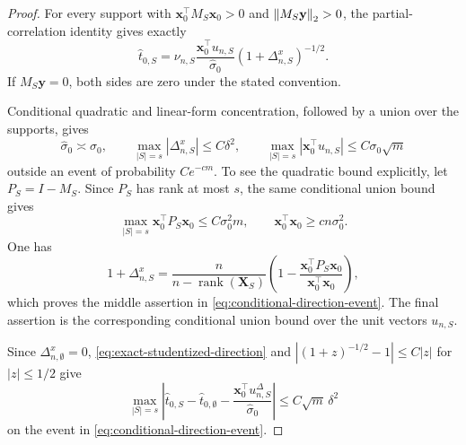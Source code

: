\begin{proof}
For every support with
$\mathbf x_0^\top M_S\mathbf x_0>0$ and
$\left\lVert M_S\mathbf y\right\rVert_2>0$, the partial-correlation identity gives exactly
\begin{equation}\label{eq:exact-studentized-direction}
        \hat t_{0,S}
        =\nu_{n,S}\frac{\mathbf x_0^\top u_{n,S}}{\hat\sigma_0}
        (1+\Delta^x_{n,S})^{-1/2}.
\end{equation}
If $M_S\mathbf y=0$, both sides are zero under the stated convention.

Conditional quadratic and linear-form concentration, followed by a union
over the supports, gives
\begin{equation}\label{eq:conditional-direction-event}
        \hat\sigma_0\asymp\sigma_0,
        \qquad
        \max_{|S|=s}|\Delta^x_{n,S}|\le C\delta^2,
        \qquad
        \max_{|S|=s}|\mathbf x_0^\top u_{n,S}|
        \le C\sigma_0\sqrt m
\end{equation}
outside an event of probability $Ce^{-cm}$.  To see the quadratic bound
explicitly, let $P_S=I-M_S$.  Since $P_S$ has rank at most $s$, the same
conditional union bound gives
\[
 \max_{|S|=s}\mathbf x_0^\top P_S\mathbf x_0
 \le C\sigma_0^2m,
 \qquad
 \mathbf x_0^\top\mathbf x_0\ge cn\sigma_0^2.
\]
One has
\[
 1+\Delta^x_{n,S}
 =\frac{n}{n-\operatorname{rank}(\mathbf X_S)}\left(1-
 \frac{\mathbf x_0^\top P_S\mathbf x_0}
 {\mathbf x_0^\top\mathbf x_0}\right),
\]
which proves the middle assertion in
\eqref{eq:conditional-direction-event}.  The final assertion is the
corresponding conditional union bound over the unit vectors $u_{n,S}$.

Since $\Delta^x_{n,\emptyset}=0$,
\eqref{eq:exact-studentized-direction} and
$|(1+z)^{-1/2}-1|\le C|z|$ for $|z|\le1/2$ give
\[
 \max_{|S|=s}\left|
 \hat t_{0,S}-\hat t_{0,\emptyset}
 -\frac{\mathbf x_0^\top u_{n,S}^{\Delta}}{\hat\sigma_0}
 \right|
 \le C\sqrt m\,\delta^2
\]
on the event in \eqref{eq:conditional-direction-event}.
\end{proof}
